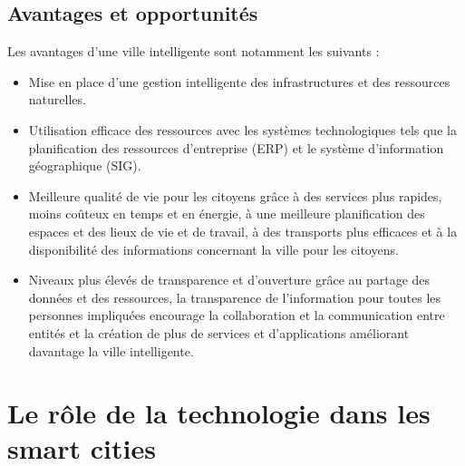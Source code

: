 \documentclass[french, a4paper, 12pt]{report}
\begin{document}
\subsection{Avantages et opportunités}
Les avantages d’une ville intelligente sont notamment les suivants :
\begin{itemize}
\item \textbf{}Mise en place d’une gestion intelligente des infrastructures et des ressources naturelles.
\item \textbf{}Utilisation efficace des ressources avec les systèmes technologiques tels que la planification des ressources d'entreprise (ERP) et le système d'information géographique (SIG).
\item \textbf{}Meilleure qualité de vie pour les citoyens grâce à des services plus rapides, moins coûteux en temps et en énergie, à une meilleure planification des espaces et des lieux de vie et de travail, à des transports plus efficaces et à la disponibilité des informations concernant la ville pour les citoyens. 
\item \textbf{}Niveaux plus élevés de transparence et d’ouverture grâce au partage des données et des ressources, la transparence de l'information pour toutes les personnes impliquées encourage la collaboration et la communication entre entités et la création de plus de services et d'applications améliorant davantage la ville intelligente.
\end{itemize}
\section{Le rôle de la technologie dans les smart cities}
\end{document}
